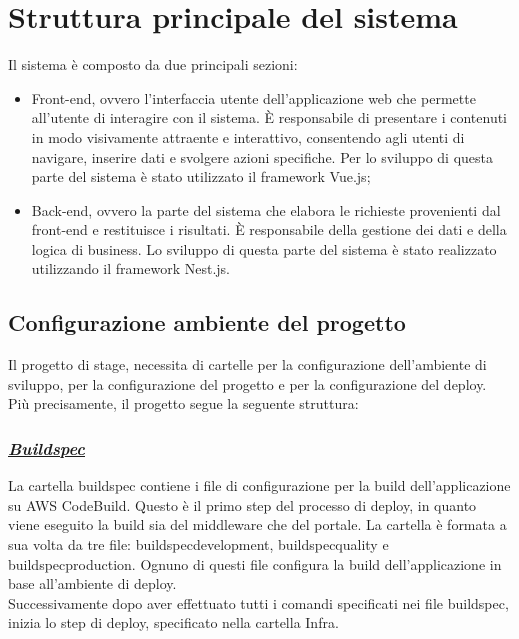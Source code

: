 \section{Struttura principale del sistema}
Il sistema è composto da due principali sezioni:
\begin{itemize}
  \item Front-end, ovvero l'interfaccia utente dell'applicazione web che permette all'utente di interagire con il sistema. È responsabile di presentare i contenuti in modo visivamente attraente e interattivo, consentendo agli utenti di navigare, inserire dati e svolgere azioni specifiche. Per lo
  sviluppo di questa parte del sistema è stato utilizzato il framework Vue.js;
  \item Back-end, ovvero la parte del sistema che elabora le richieste provenienti dal front-end e restituisce i risultati. È responsabile della gestione dei dati e della logica di business.
  Lo sviluppo di questa parte del sistema è stato realizzato utilizzando il framework Nest.js. 
\end{itemize}

\subsection{Configurazione ambiente del progetto}
Il progetto di stage, necessita di cartelle per la configurazione dell'ambiente di sviluppo, per la configurazione del progetto e per la configurazione del deploy.
Più precisamente, il progetto segue la seguente struttura:

\subsubsection*{\normalsize\textit{\uline{Buildspec}}}
La cartella buildspec contiene i file di configurazione per la build dell'applicazione su AWS CodeBuild.
Questo è il primo step del processo di deploy, in quanto viene eseguito la build sia del middleware che del portale.
La cartella è formata a sua volta da tre file: buildspecdevelopment, buildspecquality e buildspecproduction. 
Ognuno di questi file configura la build dell'applicazione in base all'ambiente di deploy.\\
Successivamente dopo aver effettuato tutti i comandi specificati nei file buildspec, inizia lo step di deploy, specificato nella cartella Infra.

